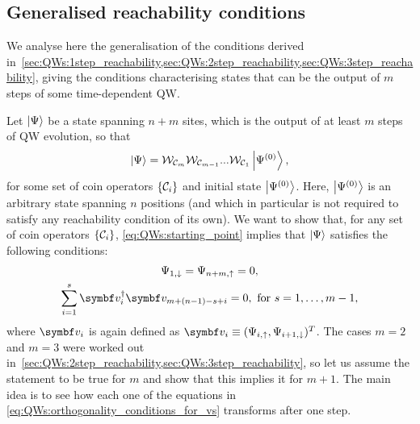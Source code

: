 \subsection{Generalised reachability conditions}
\label{sec:QWs:general_reachability_conditions}

We analyse here the generalisation of the conditions derived in~\cref{sec:QWs:1step_reachability,sec:QWs:2step_reachability,sec:QWs:3step_reachability}, giving the conditions characterising states that can be the output of $m$ steps of some time-dependent QW.

Let $\ket\Psi$ be a state spanning $n+m$ sites, which is the output of at least $m$ steps of \ac{QW} evolution, so that
\begin{equation}
	\ket\Psi =
	{\mathcal{W}}_{{\mathcal{C}}_{m}} {\mathcal{W}}_{{\mathcal{C}}_{m-1}} ... {\mathcal{W}}_{{\mathcal{C}}_{1}}
    \ket{\Psi^{(0)}},
	\label{eq:QWs:starting_point}
\end{equation}
for some set of coin operators $\{{\mathcal{C}}_i \}$ and initial state $\ket{\Psi^{(0)}}$.
Here, $\ket{\Psi^{(0)}}$ is an arbitrary state spanning $n$ positions (and which in particular is not required to satisfy any reachability condition of its own).
We want to show that, for any set of coin operators $\{{\mathcal{C}}_i \}$, \cref{eq:QWs:starting_point} implies that $\ket\Psi$ satisfies the following conditions:
\begin{gather}
	\Psi_{1,\downarrow} = \Psi_{n+m, \uparrow} = 0,
    \label{eq:QWs:vanishing_amplitudes}
	\\
    \sum_{i=1}^s \bs v_i^\dagger \bs v_{m+(n-1)-s+i} = 0,
	\text{ for } s=1,\ldots, m-1,
	\label{eq:QWs:orthogonality_conditions_for_vs}
\end{gather}
where $\bs v_{i}$ is again defined as
$\bs v_i \equiv (\Psi_{i,\uparrow}, \Psi_{i+1, \downarrow})^T$.
The cases $m=2$ and $m=3$ were worked out in~\cref{sec:QWs:2step_reachability,sec:QWs:3step_reachability},
so let us assume the statement to be true for $m$ and show that this implies it for $m+1$.
The main idea is to see how each one of the equations in \cref{eq:QWs:orthogonality_conditions_for_vs} transforms after one step.
